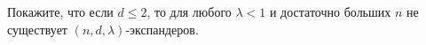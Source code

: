 Покажите, что если $d \le 2$, то для любого $\lambda < 1$ и достаточно больших $n$ не существует
$(n, d, \lambda)$-экспандеров.
